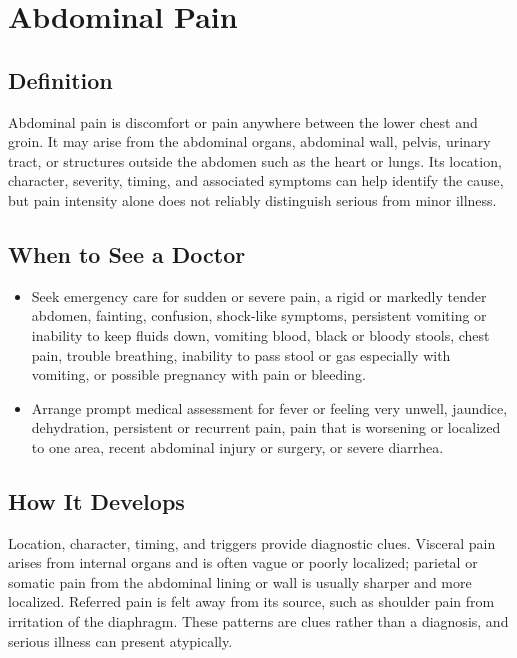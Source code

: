 \chapter{Abdominal Pain}

\section*{Definition}
Abdominal pain is discomfort or pain anywhere between the lower chest and groin. It may arise from the abdominal organs, abdominal wall, pelvis, urinary tract, or structures outside the abdomen such as the heart or lungs. Its location, character, severity, timing, and associated symptoms can help identify the cause, but pain intensity alone does not reliably distinguish serious from minor illness.

\section*{When to See a Doctor}
\begin{itemize}
 \item Seek emergency care for sudden or severe pain, a rigid or markedly tender abdomen, fainting, confusion, shock-like symptoms, persistent vomiting or inability to keep fluids down, vomiting blood, black or bloody stools, chest pain, trouble breathing, inability to pass stool or gas especially with vomiting, or possible pregnancy with pain or bleeding.
 \item Arrange prompt medical assessment for fever or feeling very unwell, jaundice, dehydration, persistent or recurrent pain, pain that is worsening or localized to one area, recent abdominal injury or surgery, or severe diarrhea.
\end{itemize}

\section*{How It Develops}
Location, character, timing, and triggers provide diagnostic clues. Visceral pain arises from internal organs and is often vague or poorly localized; parietal or somatic pain from the abdominal lining or wall is usually sharper and more localized. Referred pain is felt away from its source, such as shoulder pain from irritation of the diaphragm. These patterns are clues rather than a diagnosis, and serious illness can present atypically.

